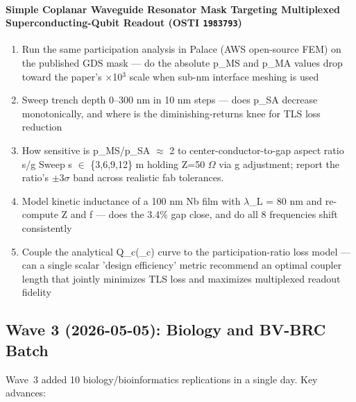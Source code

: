 \paragraph{Simple Coplanar Waveguide Resonator Mask Targeting Multiplexed Superconducting-Qubit Readout \textnormal{\small(OSTI \texttt{1983793})}}
\begin{enumerate}[leftmargin=1.6em,itemsep=0.2em,topsep=0.2em,label=Q\arabic*.]
\item Run the same participation analysis in Palace (AWS open-source FEM) on the published GDS mask --- do the absolute p\_MS and p\_MA values drop toward the paper's $\times$10$^3$ scale when sub-nm interface meshing is used
\item Sweep trench depth 0--300 nm in 10 nm steps --- does p\_SA decrease monotonically, and where is the diminishing-returns knee for TLS loss reduction
\item How sensitive is p\_MS/p\_SA $\approx$ 2 to center-conductor-to-gap aspect ratio s/g Sweep s $\in$ \{3,6,9,12\} m holding Z=50 $\Omega$ via g adjustment; report the ratio's $\pm$3$\sigma$ band across realistic fab tolerances.
\item Model kinetic inductance of a 100 nm Nb film with $\lambda$\_L = 80 nm and re-compute Z and f --- does the 3.4\% gap close, and do all 8 frequencies shift consistently
\item Couple the analytical Q\_c(\_c) curve to the participation-ratio loss model --- can a single scalar 'design efficiency' metric recommend an optimal coupler length that jointly minimizes TLS loss and maximizes multiplexed readout fidelity
\end{enumerate}

\subsection{Wave 3 (2026-05-05): Biology and BV-BRC Batch}
Wave~3 added 10 biology/bioinformatics replications in a single day. Key
advances:

